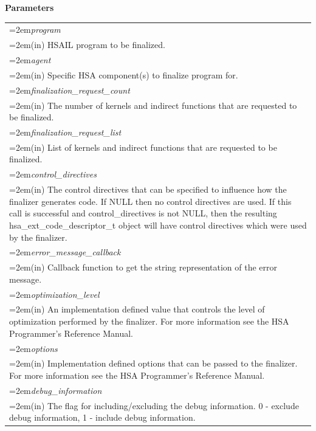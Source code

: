 \documentclass[final,oneside]{book}
\newcommand{\hsaarg}[1]{\textit{#1}}
\begin{document}
\noindent\textbf{Parameters}\\[-6mm]
\noindent\begin{longtable}{@{}>{\hangindent=2em}p{\textwidth}}
\hsaarg{program}\\\hspace{2em}(in) HSAIL program to be finalized.\\[2mm]
\hsaarg{agent}\\\hspace{2em}(in) Specific HSA component(s) to finalize program for.\\[2mm]
\hsaarg{finalization_\-request_\-count}\\\hspace{2em}(in) The number of kernels and indirect functions that are requested to be finalized.\\[2mm]
\hsaarg{finalization_\-request_\-list}\\\hspace{2em}(in) List of kernels and indirect functions that are requested to be finalized.\\[2mm]
\hsaarg{control_\-directives}\\\hspace{2em}(in) The control directives that can be specified to influence how the finalizer generates code. If NULL then no control directives are used. If this call is successful and control_\-directives is not NULL, then the resulting hsa_\-ext_\-code_\-descriptor_\-t object will have control directives which were used by the finalizer.\\[2mm]
\hsaarg{error_\-message_\-callback}\\\hspace{2em}(in) Callback function to get the string representation of the error message.\\[2mm]
\hsaarg{optimization_\-level}\\\hspace{2em}(in) An implementation defined value that controls the level of optimization performed by the finalizer. For more information see the HSA Programmer's Reference Manual.\\[2mm]
\hsaarg{options}\\\hspace{2em}(in) Implementation defined options that can be passed to the finalizer. For more information see the HSA Programmer's Reference Manual.\\[2mm]
\hsaarg{debug_\-information}\\\hspace{2em}(in) The flag for including/excluding the debug information. 0 - exclude debug information, 1 - include debug information.
\end{longtable}
\end{document}
